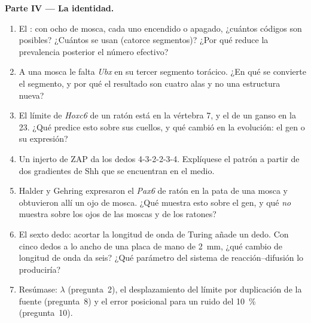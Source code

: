 \begin{problem}
\medskip
\noindent\textbf{Parte IV --- La identidad.}
\begin{enumerate}[resume]
  \item El : con ocho  de mosca, cada uno encendido o
        apagado, ¿cuántos códigos son posibles? ¿Cuántos se usan
        (catorce segmentos)? ¿Por qué reduce la prevalencia posterior el
        número efectivo?
  \item A una mosca le falta \emph{Ubx} en su tercer segmento torácico.
        ¿En qué se convierte el segmento, y por qué el resultado son
        cuatro alas y no una estructura nueva?
  \item El límite de \emph{Hoxc6} de un ratón está en la vértebra 7, y
        el de un ganso en la 23. ¿Qué predice esto sobre sus cuellos, y
        qué cambió en la evolución: el gen o su expresión?
  \item Un injerto de ZAP da los dedos 4-3-2-2-3-4. Explíquese el patrón
        a partir de dos gradientes de Shh que se encuentran en el medio.
  \item Halder y Gehring expresaron el \emph{Pax6} de ratón en la pata
        de una mosca y obtuvieron allí un ojo de mosca. ¿Qué muestra
        esto sobre el gen, y qué \emph{no} muestra sobre los ojos de las
        moscas y de los ratones?
  \item El sexto dedo: acortar la longitud de onda de Turing añade un
        dedo. Con cinco dedos a lo ancho de una placa de mano de
        \qty{2}{mm}, ¿qué cambio de longitud de onda da seis? ¿Qué
        parámetro del sistema de reacción--difusión lo produciría?
  \item Resúmase: $\lambda$ (pregunta~2), el desplazamiento del límite
        por duplicación de la fuente (pregunta~8) y el error posicional
        para un ruido del \qty{10}{\%} (pregunta~10).
\end{enumerate}
\end{problem}
